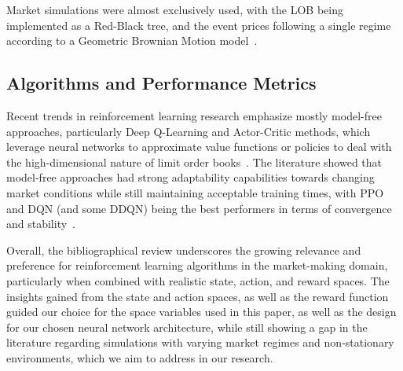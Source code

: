 Market simulations were almost exclusively used, with the LOB being implemented as a Red-Black tree,
and the event prices following a single regime according to a Geometric Brownian Motion model~\cite{Gasperov2021, Sun2022}.

\subsection{Algorithms and Performance Metrics}
\label{subsec:algorithms-and-performance-metrics}
Recent trends in reinforcement learning research emphasize mostly model-free approaches, particularly Deep Q-Learning and Actor-Critic methods,
which leverage neural networks to approximate value functions or policies to deal with the high-dimensional nature of limit order books~\cite{Patel2018, Ganesh2019}.
The literature showed that model-free approaches had strong adaptability capabilities towards changing market conditions
while still maintaining acceptable training times, with PPO and DQN (and some DDQN) being the best performers in terms of convergence and stability~\cite{Sun2022, Gasperov2021a}.

\begin{figure}[H]
    \centering
\end{figure}

\begin{figure}[H]
    \centering
\end{figure}

Overall, the bibliographical review underscores the growing relevance and preference for reinforcement learning algorithms in the market-making domain,
particularly when combined with realistic state, action, and reward spaces.
The insights gained from the state and action spaces, as well as the reward function guided our choice for the space variables used in this paper,
as well as the design for our chosen neural network architecture,
while still showing a gap in the literature regarding simulations with varying market regimes
and non-stationary environments, which we aim to address in our research.
